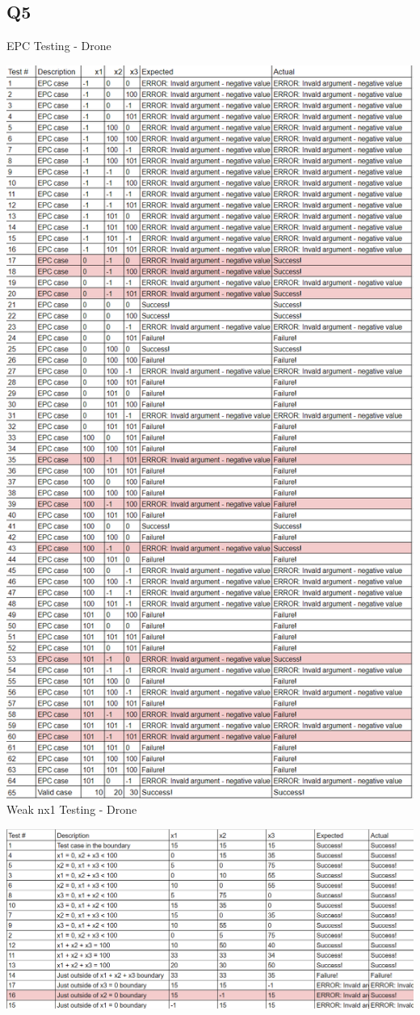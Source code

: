 \documentclass[12pt, letterpaper, titlepage]{article}
\begin{document}
\newpage
\subsection{Q5}
EPC Testing - Drone

\includegraphics[scale=0.82]{image1.png}
\newpage
Weak nx1 Testing - Drone

\includegraphics[scale=0.88]{image2.png}
\end{document}
